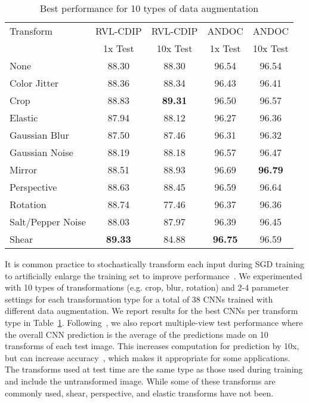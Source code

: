 \documentclass[10pt, conference, compsocconf]{IEEEtran}
\newcommand{\squeezeup}{\vspace{-2.5mm}}
\begin{document}
\begin{table}

\begin{tabular}{l|c|c|c|c}

Transform                           & RVL-CDIP & RVL-CDIP & ANDOC   & ANDOC    \\
                                    & 1x Test  & 10x Test & 1x Test & 10x Test \\
\hline
None                                & 88.30    & 88.30    & 96.54   & 96.54    \\
Color Jitter                        & 88.36    & 88.34    & 96.43   & 96.41    \\
Crop                                & 88.83    & \textbf{89.31}    & 96.50   & 96.57    \\
Elastic~\cite{simard03}             & 87.94    & 88.12    & 96.27   & 96.36    \\
Gaussian Blur                       & 87.50    & 87.46    & 96.31   & 96.32    \\
Gaussian Noise                      & 88.19    & 88.18    & 96.57   & 96.47    \\
Mirror                              & 88.51    & 88.93    & 96.69   & \textbf{96.79}    \\
Perspective                         & 88.63    & 88.45    & 96.59   & 96.64    \\
Rotation                            & 88.74    & 77.46    & 96.37   & 96.36    \\
Salt/Pepper Noise                   & 88.03    & 87.97    & 96.39   & 96.45    \\
Shear                               & \textbf{89.33} & 84.88    & \textbf{96.75}   & 96.59    \\

\end{tabular}

\caption{Best performance for 10 types of data augmentation}
\squeezeup
\squeezeup
\label{tab:aug}
\end{table}

It is common practice to stochastically transform each input during SGD training to artificially enlarge the training set to improve performance~\cite{krizhevsky12,he15residual}.
We experimented with 10 types of transformations (e.g. crop, blur, rotation) and 2-4 parameter settings for each transformation type for a total of 38 CNNs trained with different data augmentation.
We report results for the best CNNs per transform type in Table~\ref{tab:aug}.
Following~\cite{simonyan14}, we also report multiple-view test performance where the overall CNN prediction is the average of the predictions made on 10 transforms of each test image.
This increases computation for prediction by 10x, but can increase accuracy~\cite{krizhevsky12}, which makes it appropriate for some applications.
The transforms used at test time are the same type as those used during training and include the untransformed image.
While some of these transforms are commonly used, shear, perspective, and elastic transforms have not been.
\end{document}
